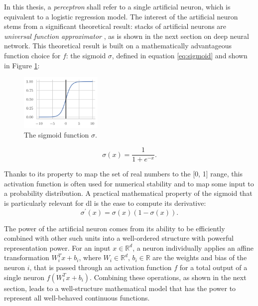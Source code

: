 In this thesis, a \textit{perceptron} shall refer to a single artificial neuron, which is equivalent to a logistic regression model. The interest of the artificial neuron stems from a significant theoretical result: stacks of artificial neurons are \textit{universal function approximator} \cite{universalFuncApproxNN,HORNIK1989359}, as is shown in the next section on deep neural network. This theoretical result is built on a mathematically advantageous function choice for $f$: the sigmoid $\sigma$, defined in equation \ref{eq:sigmoid} and shown in Figure \ref{fig:sigmoid}:
\begin{figure}
    \begin{center}
        \includegraphics[width=0.35\textwidth]{Images/ML/sigmoid.png}
        \caption{The sigmoid function $\sigma$.} 
        \label{fig:sigmoid}
    \end{center}
\end{figure}

\begin{equation}\label{eq:sigmoid}
    \sigma(x) = \frac{1}{1 + e^{-x}}.
\end{equation}

Thanks to its property to map the set of real numbers to the [0, 1] range, this activation function is often used for numerical stability and to map some input to a probability distribution. A practical mathematical property of the sigmoid that is particularly relevant for \gls{dl} is the ease to compute its derivative: \[\sigma^\prime(x) = \sigma(x) (1- \sigma(x)).\]

The power of the artificial neuron comes from its ability to be efficiently combined with other such units into a well-ordered structure with powerful representation power. For an input $x \in \mathbb{R}^d$, a neuron individually applies an affine transformation $W_i^T x + b_i$, where $W_i \in \mathbb{R}^d,\,b_i \in \mathbb{R}$ are the weights and bias of the neuron $i$, that is passed through an activation function $f$ for a total output of a single neuron $f(W_i^T x + b_i)$. Combining these operations, as shown in the next section, leads to a well-structure mathematical model that has the power to represent all well-behaved continuous functions. 

